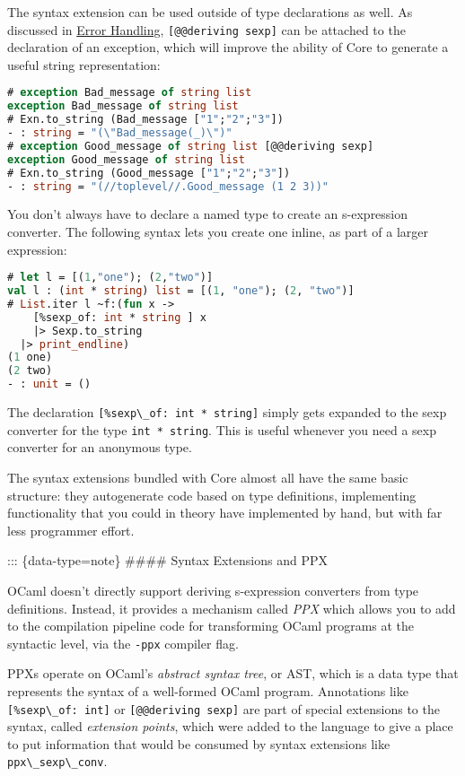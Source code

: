 The syntax extension can be used outside of type declarations as well.
As discussed in \href{error-handling.html\#error-handling}{Error
Handling}, \passthrough{\lstinline![@@deriving sexp]!} can be attached
to the declaration of an exception, which will improve the ability of
Core to generate a useful string representation:

\begin{lstlisting}[language=Caml]
# exception Bad_message of string list
exception Bad_message of string list
# Exn.to_string (Bad_message ["1";"2";"3"])
- : string = "(\"Bad_message(_)\")"
# exception Good_message of string list [@@deriving sexp]
exception Good_message of string list
# Exn.to_string (Good_message ["1";"2";"3"])
- : string = "(//toplevel//.Good_message (1 2 3))"
\end{lstlisting}

You don't always have to declare a named type to create an s-expression
converter. The following syntax lets you create one inline, as part of a
larger expression:

\begin{lstlisting}[language=Caml]
# let l = [(1,"one"); (2,"two")]
val l : (int * string) list = [(1, "one"); (2, "two")]
# List.iter l ~f:(fun x ->
    [%sexp_of: int * string ] x
    |> Sexp.to_string
  |> print_endline)
(1 one)
(2 two)
- : unit = ()
\end{lstlisting}

The declaration \passthrough{\lstinline![\%sexp\_of: int * string]!}
simply gets expanded to the sexp converter for the type
\passthrough{\lstinline!int * string!}. This is useful whenever you need
a sexp converter for an anonymous type.

The syntax extensions bundled with Core almost all have the same basic
structure: they autogenerate code based on type definitions,
implementing functionality that you could in theory have implemented by
hand, but with far less programmer effort.

::: \{data-type=note\} \#\#\#\# Syntax Extensions and PPX

OCaml doesn't directly support deriving s-expression converters from
type definitions. Instead, it provides a mechanism called \emph{PPX}
which allows you to add to the compilation pipeline code for
transforming OCaml programs at the syntactic level, via the
\passthrough{\lstinline!-ppx!} compiler flag.

PPXs operate on OCaml's \emph{abstract syntax tree}, or AST, which is a
data type that represents the syntax of a well-formed OCaml program.
Annotations like \passthrough{\lstinline![\%sexp\_of: int]!} or
\passthrough{\lstinline![@@deriving sexp]!} are part of special
extensions to the syntax, called \emph{extension points}, which were
added to the language to give a place to put information that would be
consumed by syntax extensions like
\passthrough{\lstinline!ppx\_sexp\_conv!}.

